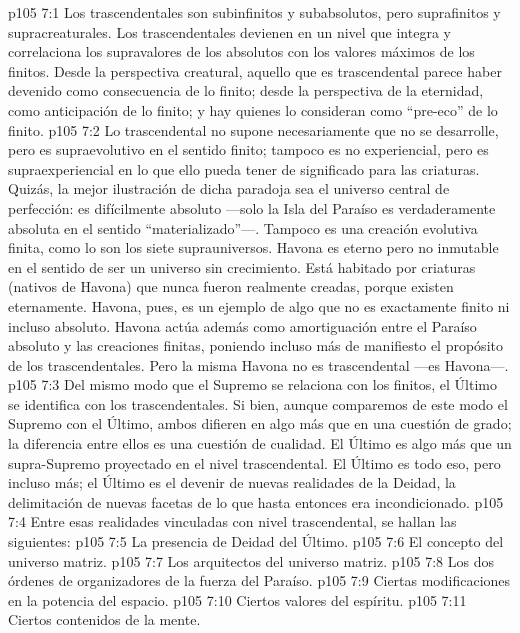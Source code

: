 \vs p105 7:1 Los trascendentales son subinfinitos y subabsolutos, pero suprafinitos y supracreaturales. Los trascendentales devienen en un nivel que integra y correlaciona los supravalores de los absolutos con los valores máximos de los finitos. Desde la perspectiva creatural, aquello que es trascendental parece haber devenido como consecuencia de lo finito; desde la perspectiva de la eternidad, como anticipación de lo finito; y hay quienes lo consideran como “pre\hyp{}eco” de lo finito.
\vs p105 7:2 Lo trascendental no supone necesariamente que no se desarrolle, pero es supraevolutivo en el sentido finito; tampoco es no experiencial, pero es supraexperiencial en lo que ello pueda tener de significado para las criaturas. Quizás, la mejor ilustración de dicha paradoja sea el universo central de perfección: es difícilmente absoluto ---solo la Isla del Paraíso es verdaderamente absoluta en el sentido “materializado”---. Tampoco es una creación evolutiva finita, como lo son los siete suprauniversos. Havona es eterno pero no inmutable en el sentido de ser un universo sin crecimiento. Está habitado por criaturas (nativos de Havona) que nunca fueron realmente creadas, porque existen eternamente. Havona, pues, es un ejemplo de algo que no es exactamente finito ni incluso absoluto. Havona actúa además como amortiguación entre el Paraíso absoluto y las creaciones finitas, poniendo incluso más de manifiesto el propósito de los trascendentales. Pero la misma Havona no es trascendental ---es Havona---.
\vs p105 7:3 Del mismo modo que el Supremo se relaciona con los finitos, el Último se identifica con los trascendentales. Si bien, aunque comparemos de este modo el Supremo con el Último, ambos difieren en algo más que en una cuestión de grado; la diferencia entre ellos es una cuestión de cualidad. El Último es algo más que un supra\hyp{}Supremo proyectado en el nivel trascendental. El Último es todo eso, pero incluso más; el Último es el devenir de nuevas realidades de la Deidad, la delimitación de nuevas facetas de lo que hasta entonces era incondicionado.
\vs p105 7:4 \pc Entre esas realidades vinculadas con nivel trascendental, se hallan las siguientes:
\vs p105 7:5 La presencia de Deidad del Último.
\vs p105 7:6 El concepto del universo matriz.
\vs p105 7:7 Los arquitectos del universo matriz.
\vs p105 7:8 Los dos órdenes de organizadores de la fuerza del Paraíso.
\vs p105 7:9 Ciertas modificaciones en la potencia del espacio.
\vs p105 7:10 Ciertos valores del espíritu.
\vs p105 7:11 Ciertos contenidos de la mente.
